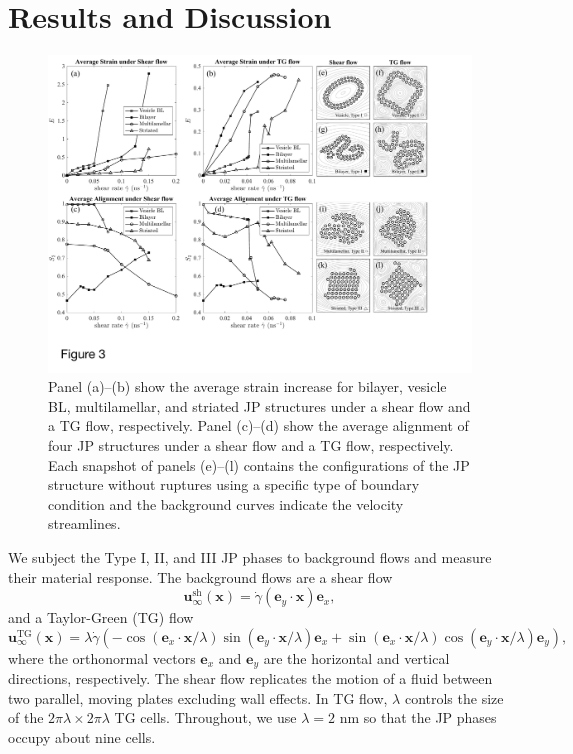 \documentclass[prb,preprint,showpacs,preprintnumbers,amsmath,amssymb,longbibliography]{revtex4-2}
\newcommand{\ee}{\mathbf{e}}
\newcommand{\xx}{\mathbf{x}}
\newcommand{\uu}{\mathbf{u}}
\begin{document}
\section{Results and Discussion}
\label{sec:results}
\begin{figure}[t]
\begin{center}
\includegraphics[width=\textwidth]{S2ESummary.pdf}
\end{center}
\caption{\label{fig:s2esummary}
  Panel (a)--(b) show the average strain increase for bilayer, vesicle
  BL, multilamellar, and striated JP structures under a shear flow and a
  TG flow, respectively. Panel (c)--(d) show the average alignment of
  four JP structures under a shear flow and a TG flow, respectively.
  Each snapshot of panels (e)--(l) contains the configurations of the JP
  structure without ruptures using a specific type of boundary condition
  and the background curves indicate the velocity streamlines.}
\end{figure}
%
We subject the Type I, II, and III JP phases to background flows and
measure their material response. The background flows are a shear flow
\begin{equation}
\label{eq:sh_flow}
\uu_\infty^{\text{sh}}(\xx) = 
\dot\gamma (\ee_y \cdot \mathbf{x})\ee_x,
\end{equation}
and a Taylor-Green (TG) flow
\begin{equation}
\label{eq:tg_flow}
\uu_\infty^{\text{TG}}(\xx) = 
\lambda \dot \gamma \left(
-\cos(\ee_x\cdot\xx/\lambda)\sin(\ee_y\cdot\xx/\lambda)\ee_x
+\sin(\ee_x\cdot\xx/\lambda)\cos(\ee_y\cdot\xx/\lambda)\ee_y\right),
\end{equation}
where the orthonormal vectors $\ee_x$ and $\ee_y$ are the horizontal and
vertical directions, respectively. The shear flow replicates the motion
of a fluid between two parallel, moving plates excluding wall effects.
In TG flow, $\lambda$ controls the size of the $2\pi \lambda \times 2\pi
\lambda$ TG cells. Throughout, we use $\lambda = 2$ nm so that the JP
phases occupy about nine cells.
\end{document}
